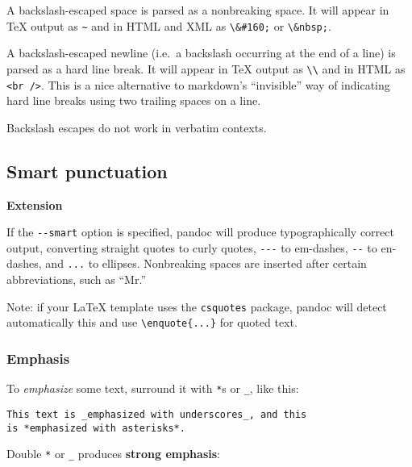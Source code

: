 \documentclass[]{article}
\begin{document}
A backslash-escaped space is parsed as a nonbreaking space. It will
appear in TeX output as \texttt{\textasciitilde{}} and in HTML and XML
as \texttt{\textbackslash{}\&\#160;} or
\texttt{\textbackslash{}\&nbsp;}.

A backslash-escaped newline (i.e.~a backslash occurring at the end of a
line) is parsed as a hard line break. It will appear in TeX output as
\texttt{\textbackslash{}\textbackslash{}} and in HTML as
\texttt{\textless{}br /\textgreater{}}. This is a nice alternative to
markdown's ``invisible'' way of indicating hard line breaks using two
trailing spaces on a line.

Backslash escapes do not work in verbatim contexts.

\subsection{Smart punctuation}\label{smart-punctuation}

\textbf{Extension}

If the \texttt{-{}-smart} option is specified, pandoc will produce
typographically correct output, converting straight quotes to curly
quotes, \texttt{-{}-{}-} to em-dashes, \texttt{-{}-} to en-dashes, and
\texttt{...} to ellipses. Nonbreaking spaces are inserted after certain
abbreviations, such as ``Mr.''

Note: if your LaTeX template uses the \texttt{csquotes} package, pandoc
will detect automatically this and use
\texttt{\textbackslash{}enquote\{...\}} for quoted text.


\subsubsection{Emphasis}\label{emphasis}

To \emph{emphasize} some text, surround it with \texttt{*}s or
\texttt{\_}, like this:

\begin{verbatim}
This text is _emphasized with underscores_, and this
is *emphasized with asterisks*.
\end{verbatim}

Double \texttt{*} or \texttt{\_} produces \textbf{strong emphasis}:
\end{document}
